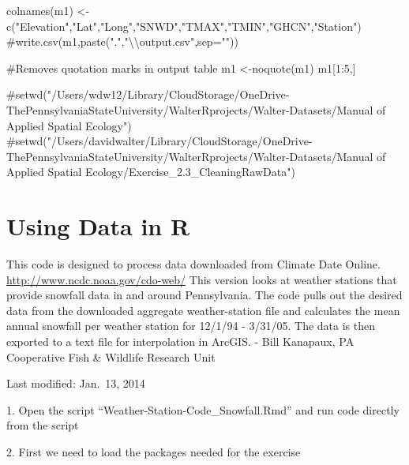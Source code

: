 \documentclass[
  letterpaper,
]{book}
\newenvironment{Shaded}{\begin{snugshade}}{\end{snugshade}}
\newcommand{\CommentTok}[1]{\textcolor[rgb]{0.37,0.37,0.37}{#1}}
\newcommand{\DecValTok}[1]{\textcolor[rgb]{0.68,0.00,0.00}{#1}}
\newcommand{\FunctionTok}[1]{\textcolor[rgb]{0.28,0.35,0.67}{#1}}
\newcommand{\NormalTok}[1]{\textcolor[rgb]{0.00,0.23,0.31}{#1}}
\newcommand{\OtherTok}[1]{\textcolor[rgb]{0.00,0.23,0.31}{#1}}
\newcommand{\SpecialCharTok}[1]{\textcolor[rgb]{0.37,0.37,0.37}{#1}}
\newcommand{\StringTok}[1]{\textcolor[rgb]{0.13,0.47,0.30}{#1}}
\begin{document}
\begin{Shaded}
\begin{Highlighting}[]
\FunctionTok{colnames}\NormalTok{(m1) }\OtherTok{\textless{}{-}} \FunctionTok{c}\NormalTok{(}\StringTok{"Elevation"}\NormalTok{,}\StringTok{"Lat"}\NormalTok{,}\StringTok{"Long"}\NormalTok{,}\StringTok{"SNWD"}\NormalTok{,}\StringTok{"TMAX"}\NormalTok{,}\StringTok{"TMIN"}\NormalTok{,}\StringTok{"GHCN"}\NormalTok{,}\StringTok{"Station"}\NormalTok{)}
\CommentTok{\#write.csv(m1,paste(".","\textbackslash{}\textbackslash{}output.csv",sep=""))}

\CommentTok{\#Removes quotation marks in output table}
\NormalTok{m1 }\OtherTok{\textless{}{-}}\FunctionTok{noquote}\NormalTok{(m1)}
\NormalTok{m1[}\DecValTok{1}\SpecialCharTok{:}\DecValTok{5}\NormalTok{,]}
\end{Highlighting}
\end{Shaded}

\begin{Shaded}
\begin{Highlighting}[]
\CommentTok{\#setwd("/Users/wdw12/Library/CloudStorage/OneDrive{-}ThePennsylvaniaStateUniversity/WalterRprojects/Walter{-}Datasets/Manual of Applied Spatial Ecology")}
\CommentTok{\#setwd("/Users/davidwalter/Library/CloudStorage/OneDrive{-}ThePennsylvaniaStateUniversity/WalterRprojects/Walter{-}Datasets/Manual of Applied Spatial Ecology/Exercise\_2.3\_CleaningRawData")}
\end{Highlighting}
\end{Shaded}

\hypertarget{using-data-in-r}{%
\chapter{Using Data in R}\label{using-data-in-r}}

This code is designed to process data downloaded from Climate Date
Online. \url{http://www.ncdc.noaa.gov/cdo-web/} This version looks at
weather stations that provide snowfall data in and around Pennsylvania.
The code pulls out the desired data from the downloaded aggregate
weather-station file and calculates the mean annual snowfall per weather
station for 12/1/94 - 3/31/05. The data is then exported to a text file
for interpolation in ArcGIS. - Bill Kanapaux, PA Cooperative Fish \&
Wildlife Research Unit

Last modified: Jan.~13, 2014

1. Open the script ``Weather-Station-Code\_Snowfall.Rmd'' and run code
directly from the script

2. First we need to load the packages needed for the exercise
\end{document}
